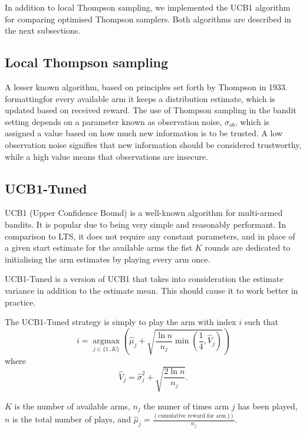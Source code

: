 In addition to local Thompson sampling, we implemented the UCB1 algorithm for 
comparing optimised Thompson samplers. Both algorithms are described in the next 
subsections.

\subsection{Local Thompson sampling}
A lesser known algorithm, based on principles set forth by Thompson in 1933. 
formattingfor every available arm it keeps a distribution estimate, which is 
updated based on received reward. The use of Thompson sampling in the bandit 
setting depends on a parameter known as observation noise, $\sigma_{ob}$, which 
is assigned a value based on how much new information is to be trusted. A low 
observation noise signifies that new information should be considered 
trustworthy, while a high value means that observations are insecure. 

\subsection{UCB1-Tuned}


UCB1 \cite{Auer02UCB1} (Upper Confidence Bound) is a well-known algorithm for multi-armed bandits.
It is popular due to being very simple and reasonably performant. In comparison 
to LTS, it does not require any constant parameters, and in place of a given 
start estimate for the available arms the fist $K$ rounds are dedicated to 
initialising the arm estimates by playing every arm once.

UCB1-Tuned is a version of UCB1 that takes into consideration the estimate variance in addition to the estimate mean. This should cause it to work better in practice.

The UCB1-Tuned strategy is simply to play the arm with index $i$ such that
\begin{displaymath}
    i = \operatorname*{argmax}_{j \in \{ 1..K \}} \left(\hat{\mu}_j + 
    \sqrt{\frac{\ln{n}}{n_j} \min(\frac{1}{4},\hat{V}_j)}\right)
\end{displaymath}
where 
\begin{displaymath}
    \hat{V}_j = \hat{\sigma}_j^2 + \sqrt{\frac{2\ln{n}}{n_j}}\text{.}
\end{displaymath}

$K$ is the number of available arms, $n_j$ the numer of times arm $j$ has 
been played, $n$ is the total number of plays, and $\hat{\mu}_j 
=\frac{(\text{cumulative reward for arm j})}{n_j}$.


